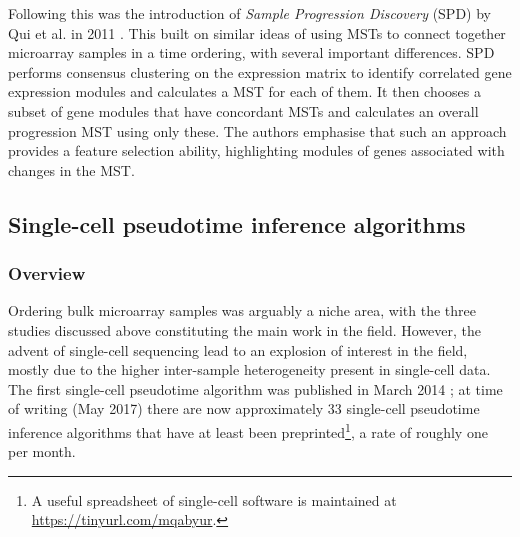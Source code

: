 Following this was the introduction of \emph{Sample Progression Discovery} (SPD) by Qui et al. in 2011 \cite{Qiu2011-ol}. This built on similar ideas of using MSTs to connect together microarray samples in a time ordering, with several important differences. SPD performs consensus clustering on the expression matrix to identify correlated gene expression modules and calculates a MST for each of them. It then chooses a subset of gene modules that have concordant MSTs and calculates an overall progression MST using only these. The authors emphasise that such an approach provides a feature selection ability, highlighting modules of genes associated with changes in the MST.



\subsection{Single-cell pseudotime inference algorithms}

\subsubsection{Overview}

Ordering bulk microarray samples was arguably a niche area, with the three studies discussed above constituting the main work in the field. However, the advent of single-cell sequencing lead to an explosion of interest in the field, mostly due to the higher inter-sample heterogeneity present in single-cell data. The first single-cell pseudotime algorithm was published in March 2014 \cite{Trapnell2014-xi}; at time of writing (May 2017) there are now approximately 33 single-cell pseudotime inference algorithms that have at least been preprinted\footnote{
A useful spreadsheet of single-cell software is maintained at \url{https://tinyurl.com/mqabyur}.
}, a rate of roughly one per month.

